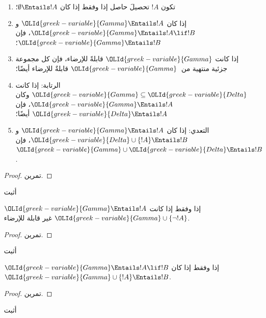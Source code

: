 \documentclass[../../../include/open-logic-section]{subfiles}
\begin{document}
\begin{prop}
\begin{enumerate}
\item تكون $!A$ تحصيلَ حاصل إذا وفقط إذا كان
  $\emptyset \Entails !A$؛
\item إذا كان ${\OLId{greek-variable}{Gamma}} \Entails !A$ و${\OLId{greek-variable}{Gamma}} \Entails !A \lif !B$، فإن
  ${\OLId{greek-variable}{Gamma}} \Entails !B$؛
\item إذا كانت ${\OLId{greek-variable}{Gamma}}$ قابلةً للإرضاء، فإن كل مجموعة جزئية منتهية
  من~${\OLId{greek-variable}{Gamma}}$ قابلةٌ للإرضاء أيضًا؛
\item {} الرتابة: إذا كانت ${\OLId{greek-variable}{Gamma}} \subseteq {\OLId{greek-variable}{Delta}}$
  وكان ${\OLId{greek-variable}{Gamma}} \Entails !A$، فإن ${\OLId{greek-variable}{Delta}} \Entails !A$ أيضًا؛
\item {} التعدي: إذا كان ${\OLId{greek-variable}{Gamma}} \Entails !A$ و
  ${\OLId{greek-variable}{Delta}} \cup \{ !A\} \Entails !B$، فإن ${\OLId{greek-variable}{Gamma}} \cup {\OLId{greek-variable}{Delta}} \Entails
  !B$.
\end{enumerate}
\end{prop}

\begin{proof}
تمرين.
\end{proof}

\begin{prob}
أثبت 
\end{prob}

\begin{prop}
  ${\OLId{greek-variable}{Gamma}} \Entails !A$ إذا وفقط إذا كانت ${\OLId{greek-variable}{Gamma}} \cup \{\lnot !A\}$
  غير قابلة للإرضاء.
\end{prop}

\begin{proof}
تمرين.
\end{proof}

\begin{prob}
أثبت 
\end{prob}

\begin{thm}
   ${\OLId{greek-variable}{Gamma}} \Entails !A \lif !B$ إذا وفقط
  إذا كان ${\OLId{greek-variable}{Gamma}} \cup \{!A\} \Entails !B$.
\end{thm}

\begin{proof}
تمرين.
\end{proof}

\begin{prob}
أثبت 
\end{prob}
\end{document}
